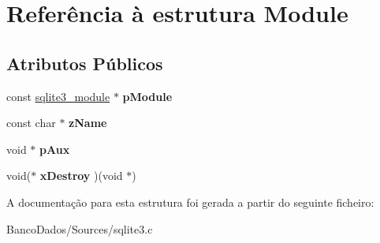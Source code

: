 \hypertarget{struct_module}{\section{Referência à estrutura Module}
\label{struct_module}
}
\subsection*{Atributos Públicos}
\begin{DoxyCompactItemize}
\item 
\hypertarget{struct_module_a65d2539d71ea028b505b2fb33563bfd7}{const \hyperlink{structsqlite3__module}{sqlite3\-\_\-module} $\ast$ {\bfseries p\-Module}}\label{struct_module_a65d2539d71ea028b505b2fb33563bfd7}

\item 
\hypertarget{struct_module_a45a5f5b43926b8ebf3e13e46a6534810}{const char $\ast$ {\bfseries z\-Name}}\label{struct_module_a45a5f5b43926b8ebf3e13e46a6534810}

\item 
\hypertarget{struct_module_ae3b827fee4c8b4f3ff38c86c2e2f48cd}{void $\ast$ {\bfseries p\-Aux}}\label{struct_module_ae3b827fee4c8b4f3ff38c86c2e2f48cd}

\item 
\hypertarget{struct_module_a4be509110a1a2f2c06a5d69af45704ca}{void($\ast$ {\bfseries x\-Destroy} )(void $\ast$)}\label{struct_module_a4be509110a1a2f2c06a5d69af45704ca}

\end{DoxyCompactItemize}


A documentação para esta estrutura foi gerada a partir do seguinte ficheiro\-:\begin{DoxyCompactItemize}
\item 
Banco\-Dados/\-Sources/sqlite3.\-c\end{DoxyCompactItemize}
